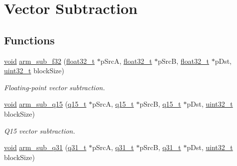 \hypertarget{group___basic_sub}{\section{Vector Subtraction}
\label{group___basic_sub}
}
\subsection*{Functions}
\begin{DoxyCompactItemize}
\item 
\hyperlink{group___n_a_m_e_ga18028b8badbf1ea7e704ccac3c488e82}{void} \hyperlink{group___basic_sub_ga7f975a472de286331134227c08aad826}{arm\-\_\-sub\-\_\-f32} (\hyperlink{arm__math_8h_a4611b605e45ab401f02cab15c5e38715}{float32\-\_\-t} $\ast$p\-Src\-A, \hyperlink{arm__math_8h_a4611b605e45ab401f02cab15c5e38715}{float32\-\_\-t} $\ast$p\-Src\-B, \hyperlink{arm__math_8h_a4611b605e45ab401f02cab15c5e38715}{float32\-\_\-t} $\ast$p\-Dst, \hyperlink{stdint_8h_a435d1572bf3f880d55459d9805097f62}{uint32\-\_\-t} block\-Size)
\begin{DoxyCompactList}\small\item\em Floating-\/point vector subtraction. \end{DoxyCompactList}\item 
\hyperlink{group___n_a_m_e_ga18028b8badbf1ea7e704ccac3c488e82}{void} \hyperlink{group___basic_sub_ga997a8ee93088d15bda23c325d455b588}{arm\-\_\-sub\-\_\-q15} (\hyperlink{arm__math_8h_ab5a8fb21a5b3b983d5f54f31614052ea}{q15\-\_\-t} $\ast$p\-Src\-A, \hyperlink{arm__math_8h_ab5a8fb21a5b3b983d5f54f31614052ea}{q15\-\_\-t} $\ast$p\-Src\-B, \hyperlink{arm__math_8h_ab5a8fb21a5b3b983d5f54f31614052ea}{q15\-\_\-t} $\ast$p\-Dst, \hyperlink{stdint_8h_a435d1572bf3f880d55459d9805097f62}{uint32\-\_\-t} block\-Size)
\begin{DoxyCompactList}\small\item\em Q15 vector subtraction. \end{DoxyCompactList}\item 
\hyperlink{group___n_a_m_e_ga18028b8badbf1ea7e704ccac3c488e82}{void} \hyperlink{group___basic_sub_ga28aa6908d092752144413e21933dc878}{arm\-\_\-sub\-\_\-q31} (\hyperlink{arm__math_8h_adc89a3547f5324b7b3b95adec3806bc0}{q31\-\_\-t} $\ast$p\-Src\-A, \hyperlink{arm__math_8h_adc89a3547f5324b7b3b95adec3806bc0}{q31\-\_\-t} $\ast$p\-Src\-B, \hyperlink{arm__math_8h_adc89a3547f5324b7b3b95adec3806bc0}{q31\-\_\-t} $\ast$p\-Dst, \hyperlink{stdint_8h_a435d1572bf3f880d55459d9805097f62}{uint32\-\_\-t} block\-Size)

\end{DoxyCompactItemize}

